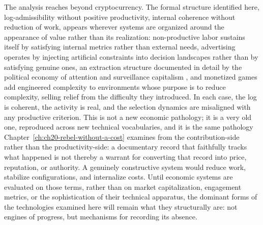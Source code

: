 The analysis reaches beyond cryptocurrency. The formal structure identified here, log-admissibility without positive productivity, internal coherence without reduction of work, appears wherever systems are organized around the appearance of value rather than its realization: non-productive labor sustains itself by satisfying internal metrics rather than external needs, advertising operates by injecting artificial constraints into decision landscapes rather than by satisfying genuine ones, an extraction structure documented in detail by the political economy of attention and surveillance capitalism \cite{wu2016,zuboff2019}, and monetized games add engineered complexity to environments whose purpose is to reduce complexity, selling relief from the difficulty they introduced. In each case, the log is coherent, the activity is real, and the selection dynamics are misaligned with any productive criterion. This is not a new economic pathology; it is a very old one, reproduced across new technical vocabularies, and it is the same pathology Chapter~\ref{ch:ch20-rebel-without-a-cost} examines from the contribution-side rather than the productivity-side: a documentary record that faithfully tracks what happened is not thereby a warrant for converting that record into price, reputation, or authority. A genuinely constructive system would reduce work, stabilize configurations, and internalize costs. Until economic systems are evaluated on those terms, rather than on market capitalization, engagement metrics, or the sophistication of their technical apparatus, the dominant forms of the technologies examined here will remain what they structurally are: not engines of progress, but mechanisms for recording its absence.
